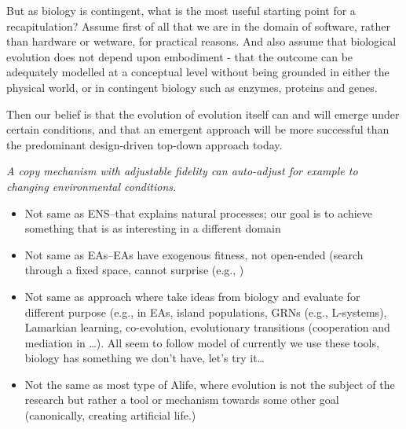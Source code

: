 But as biology is contingent, what is the most useful starting point for a recapitulation? Assume first of all that we are in the domain of software, rather than hardware or wetware, for practical reasons. And also assume that biological evolution does not depend upon embodiment - that the outcome can be adequately modelled at a conceptual level without being grounded in either the physical world, or in contingent biology such as enzymes, proteins and genes.

Then our belief is that the evolution of evolution itself can and will emerge under certain conditions, and that an emergent approach will be more successful than the predominant design-driven top-down approach today.



\emph{A copy mechanism with adjustable fidelity can auto-adjust for example to changing environmental conditions.}

\begin{itemize}
	\item
	      Not same as ENS--that explains natural processes; our goal is to achieve something that is as interesting in a different domain
	\item 
	      Not same as EAs--EAs have exogenous fitness, not open-ended (search through a fixed space, cannot surprise (e.g., \parencite{Nellis2014})
	\item  
	      Not same as approach where take ideas from biology and evaluate for different purpose (e.g., in EAs, island populations, GRNs (e.g., L-systems), Lamarkian learning, co-evolution, evolutionary transitions (cooperation and mediation in \parencite{Defaweux:2005fk}\ldots{}). All seem to follow model of currently we use these tools, biology has something we don't have, let's try it\ldots{}
	\item
	      Not the same as most type of Alife, where evolution is not the subject of the research but rather a tool or mechanism towards some other goal (canonically, creating artificial life.)
\end{itemize}

